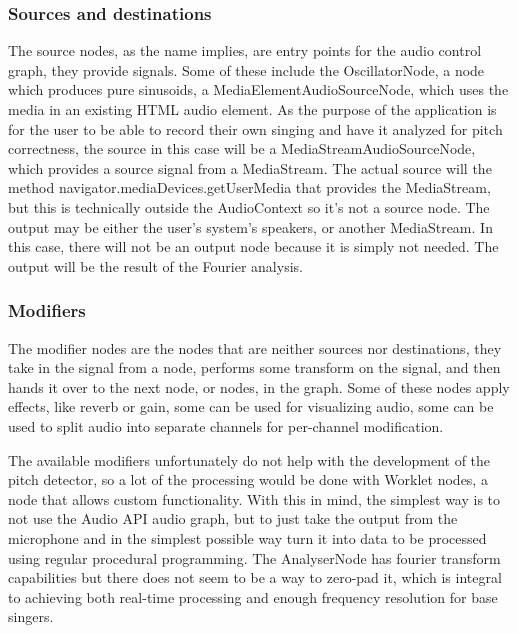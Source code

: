 \subsubsection{Sources and destinations}
The source nodes, as the name implies, are entry points for the audio control graph, they provide signals. Some of these include the OscillatorNode, a node which produces pure sinusoids, a MediaElementAudioSourceNode, which uses the media in an existing HTML audio element. As the purpose of the application is for the user to be able to record their own singing and have it analyzed for pitch correctness, the source in this case will be a MediaStreamAudioSourceNode, which provides a source signal from a MediaStream. The actual source will the method navigator.mediaDevices.getUserMedia\(\) that provides the MediaStream, but this is technically outside the AudioContext so it's not a source node.  
The output may be either the user's system's speakers, or another MediaStream. In this case, there will not be an output node because it is simply not needed. The output will be the result of the Fourier analysis.

\subsubsection{Modifiers} 
The modifier nodes are the nodes that are neither sources nor destinations, they take in the signal from a node, performs some transform on the signal, and then hands it over to the next node, or nodes, in the graph. Some of these nodes apply effects, like reverb or gain, some can be used for visualizing audio, some can be used to split audio into separate channels for per-channel modification.

The available modifiers unfortunately do not help with the development of the pitch detector, so a lot of the processing would be done with Worklet nodes, a node that allows custom functionality. With this in mind, the simplest way is to not use the Audio API audio graph, but to just take the output from the microphone and in the simplest possible way turn it into data to be processed using regular procedural programming. The AnalyserNode has fourier transform capabilities but there does not seem to be a way to zero-pad it, which is integral to achieving both real-time processing and enough frequency resolution for base singers. 

